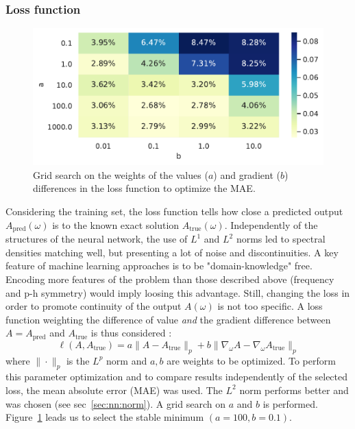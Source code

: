 \documentclass[reprint,amsmath,amssymb,aps,pra]{revtex4-2}
\begin{document}
\subsubsection{Loss function}

\begin{figure}[H]
\includegraphics[width=\columnwidth]{analytical_continuation/norm_weighting_a_b2.pdf}
\caption{\label{fig:norm_a_b}Grid search on the weights of the values ($a$) and gradient ($b$) differences in the loss function to optimize the MAE.}
\end{figure}

Considering the training set, the loss function tells how close a predicted output $A_\text{pred}(\omega)$ is to the known exact solution $A_\text{true}(\omega)$.
Independently of the structures of the neural network, the use of $L^1$ and $L^2$ norms led to spectral densities matching well, but presenting a lot of noise and discontinuities. A key feature of machine learning approaches is to be "domain-knowledge" free. Encoding more features of the problem than those described above (frequency and p-h symmetry) would imply loosing this advantage. Still, changing the loss in order to promote continuity of the output $A(\omega)$ is not too specific. A loss function weighting the difference of value \emph{and} the gradient difference between $A=A_\text{pred}$ and $A_\text{true}$ is thus considered :
\begin{equation*}
    \ell(A, A_\text{true}) = a \| A - A_\text{true} \|_p + b \| \nabla_{\omega} A - \nabla_{\omega} A_\text{true} \|_p
\end{equation*}
where $\|\cdot\|_p$ is the $L^p$ norm and $a,b$ are weights to be optimized. To perform this parameter optimization and to compare results independently of the selected loss, the mean absolute error (MAE) was used. The $L^2$ norm performs better and was chosen (see sec~\ref{sec:nn:norm}). A grid search on $a$ and $b$ is performed. Figure~\ref{fig:norm_a_b} leads us to select the stable minimum $(a=100,b=0.1)$.
\end{document}
